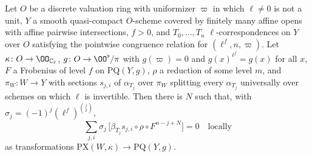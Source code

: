 \begin{lemma}\label{pf:steps1:wzero}
Let $O$ be a discrete valuation ring with uniformizer $\varpi$ in which $\ell\ne0$ is not a unit, $Y$ a smooth quasi-compact
$O$-scheme covered by finitely many affine opens with affine pairwise intersections, $f>0$, and $T_0,\dots,T_n$ $\ell$-correspondences
on $Y$ over $O$ satisfying the pointwise congruence relation for $(\ell^f,n,\varpi)$. Let $\kappa\colon O\to\OO_{\stepsICl}$, $g\colon
O\to\OO^\flat/\pi$ with $g(\varpi)=0$ and $g(x)^{\ell^f}=g(x)$ for all $x$, $F$ a Frobenius of level $f$ on $\mathrm{PQ}(Y,g)$, $\rho$ a
reduction of some level $m$, and $\pi_W\colon W\to Y$ with sections $s_{j,i}$ of $\alpha_{T_j}$ over $\pi_W$ splitting every
$\alpha_{T_j}$ universally over schemes on which $\ell$ is invertible. Then there is $N$ such that, with $\sigma_j=(-1)^j(\ell^f)^{\binom j2}$,
\[
 \sum_{j,i}\sigma_j\,\bigl[\beta_{T_j}s_{j,i}\circ\rho\circ F^{n-j+N}\bigr]=0\quad\text{locally}
\]
as transformations $\mathrm{PX}(W,\kappa)\to\mathrm{PQ}(Y,g)$.
\end{lemma}

